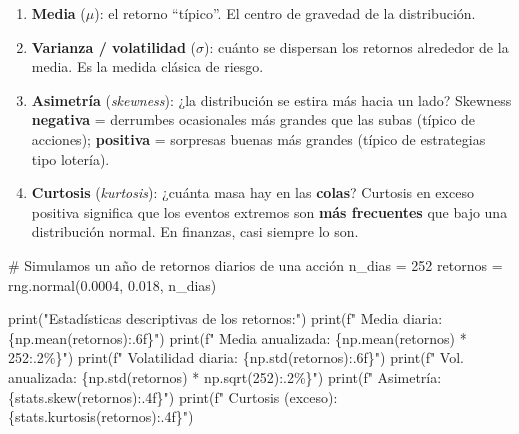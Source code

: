 \documentclass[
  spanish,
  letterpaper,
  DIV=11,
  numbers=noendperiod]{scrreprt}
\newenvironment{Shaded}{\begin{snugshade}}{\end{snugshade}}
\newcommand{\BuiltInTok}[1]{\textcolor[rgb]{0.00,0.23,0.31}{#1}}
\newcommand{\CommentTok}[1]{\textcolor[rgb]{0.37,0.37,0.37}{#1}}
\newcommand{\DecValTok}[1]{\textcolor[rgb]{0.68,0.00,0.00}{#1}}
\newcommand{\FloatTok}[1]{\textcolor[rgb]{0.68,0.00,0.00}{#1}}
\newcommand{\NormalTok}[1]{\textcolor[rgb]{0.00,0.23,0.31}{#1}}
\newcommand{\OperatorTok}[1]{\textcolor[rgb]{0.37,0.37,0.37}{#1}}
\newcommand{\SpecialCharTok}[1]{\textcolor[rgb]{0.37,0.37,0.37}{#1}}
\newcommand{\SpecialStringTok}[1]{\textcolor[rgb]{0.13,0.47,0.30}{#1}}
\newcommand{\StringTok}[1]{\textcolor[rgb]{0.13,0.47,0.30}{#1}}
\providecommand{\tightlist}{%
  \setlength{\itemsep}{0pt}\setlength{\parskip}{0pt}}
\begin{document}
\begin{enumerate}
\def\labelenumi{\arabic{enumi}.}
\tightlist
\item
  \textbf{Media} (\(\mu\)): el retorno ``típico''. El centro de gravedad
  de la distribución.
\item
  \textbf{Varianza / volatilidad} (\(\sigma\)): cuánto se dispersan los
  retornos alrededor de la media. Es la medida clásica de riesgo.
\item
  \textbf{Asimetría} (\emph{skewness}): ¿la distribución se estira más
  hacia un lado? Skewness \textbf{negativa} = derrumbes ocasionales más
  grandes que las subas (típico de acciones); \textbf{positiva} =
  sorpresas buenas más grandes (típico de estrategias tipo lotería).
\item
  \textbf{Curtosis} (\emph{kurtosis}): ¿cuánta masa hay en las
  \textbf{colas}? Curtosis en exceso positiva significa que los eventos
  extremos son \textbf{más frecuentes} que bajo una distribución normal.
  En finanzas, casi siempre lo son.
\end{enumerate}

\label{estadistica}
\begin{Shaded}
\begin{Highlighting}[]
\CommentTok{\# Simulamos un año de retornos diarios de una acción}
\NormalTok{n\_dias }\OperatorTok{=} \DecValTok{252}
\NormalTok{retornos }\OperatorTok{=}\NormalTok{ rng.normal(}\FloatTok{0.0004}\NormalTok{, }\FloatTok{0.018}\NormalTok{, n\_dias)}

\BuiltInTok{print}\NormalTok{(}\StringTok{"Estadísticas descriptivas de los retornos:"}\NormalTok{)}
\BuiltInTok{print}\NormalTok{(}\SpecialStringTok{f"  Media diaria:       }\SpecialCharTok{\{}\NormalTok{np}\SpecialCharTok{.}\NormalTok{mean(retornos)}\SpecialCharTok{:.6f\}}\SpecialStringTok{"}\NormalTok{)}
\BuiltInTok{print}\NormalTok{(}\SpecialStringTok{f"  Media anualizada:   }\SpecialCharTok{\{}\NormalTok{np}\SpecialCharTok{.}\NormalTok{mean(retornos) }\OperatorTok{*} \DecValTok{252}\SpecialCharTok{:.2\%\}}\SpecialStringTok{"}\NormalTok{)}
\BuiltInTok{print}\NormalTok{(}\SpecialStringTok{f"  Volatilidad diaria: }\SpecialCharTok{\{}\NormalTok{np}\SpecialCharTok{.}\NormalTok{std(retornos)}\SpecialCharTok{:.6f\}}\SpecialStringTok{"}\NormalTok{)}
\BuiltInTok{print}\NormalTok{(}\SpecialStringTok{f"  Vol. anualizada:    }\SpecialCharTok{\{}\NormalTok{np}\SpecialCharTok{.}\NormalTok{std(retornos) }\OperatorTok{*}\NormalTok{ np}\SpecialCharTok{.}\NormalTok{sqrt(}\DecValTok{252}\NormalTok{)}\SpecialCharTok{:.2\%\}}\SpecialStringTok{"}\NormalTok{)}
\BuiltInTok{print}\NormalTok{(}\SpecialStringTok{f"  Asimetría:          }\SpecialCharTok{\{}\NormalTok{stats}\SpecialCharTok{.}\NormalTok{skew(retornos)}\SpecialCharTok{:.4f\}}\SpecialStringTok{"}\NormalTok{)}
\BuiltInTok{print}\NormalTok{(}\SpecialStringTok{f"  Curtosis (exceso):  }\SpecialCharTok{\{}\NormalTok{stats}\SpecialCharTok{.}\NormalTok{kurtosis(retornos)}\SpecialCharTok{:.4f\}}\SpecialStringTok{"}\NormalTok{)}
\end{Highlighting}
\end{Shaded}
\end{document}

